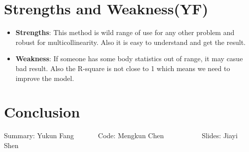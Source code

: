 \documentclass[12pt]{article}
\begin{document}
\section{\sffamily Strengths and Weakness(YF)}
\begin{itemize}
    \item \textbf{Strengths}: This method is wild range of use for any other problem and robust for multicollinearity. Also it is easy to understand and 
    get the result.
    \item \textbf{Weakness}: If someone has some body statistics out of
    range, it may casue bad result. Also the R-square is not close to 1 which means 
    we need to improve the model.
\end{itemize}
\section{\sffamily Conclusion}
    \centerline{Summary: Yukun Fang~~~~~~~Code: Mengkun Chen~~~~~~~~~~~Slides: Jiayi Shen}
\end{document}
